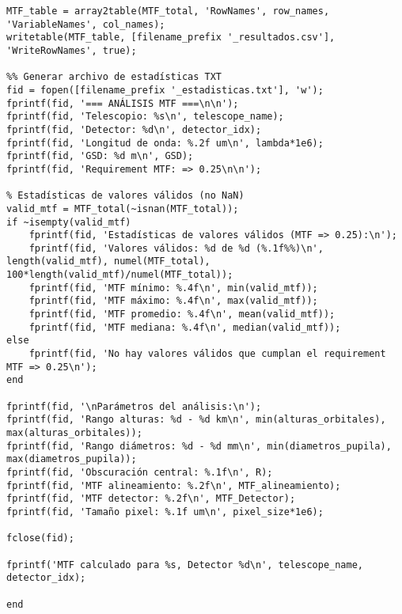 \begin{verbatim}
MTF_table = array2table(MTF_total, 'RowNames', row_names, 'VariableNames', col_names);
writetable(MTF_table, [filename_prefix '_resultados.csv'], 'WriteRowNames', true);

%% Generar archivo de estadísticas TXT
fid = fopen([filename_prefix '_estadisticas.txt'], 'w');
fprintf(fid, '=== ANÁLISIS MTF ===\n\n');
fprintf(fid, 'Telescopio: %s\n', telescope_name);
fprintf(fid, 'Detector: %d\n', detector_idx);
fprintf(fid, 'Longitud de onda: %.2f um\n', lambda*1e6);
fprintf(fid, 'GSD: %d m\n', GSD);
fprintf(fid, 'Requirement MTF: => 0.25\n\n');

% Estadísticas de valores válidos (no NaN)
valid_mtf = MTF_total(~isnan(MTF_total));
if ~isempty(valid_mtf)
    fprintf(fid, 'Estadísticas de valores válidos (MTF => 0.25):\n');
    fprintf(fid, 'Valores válidos: %d de %d (%.1f%%)\n', length(valid_mtf), numel(MTF_total), 100*length(valid_mtf)/numel(MTF_total));
    fprintf(fid, 'MTF mínimo: %.4f\n', min(valid_mtf));
    fprintf(fid, 'MTF máximo: %.4f\n', max(valid_mtf));
    fprintf(fid, 'MTF promedio: %.4f\n', mean(valid_mtf));
    fprintf(fid, 'MTF mediana: %.4f\n', median(valid_mtf));
else
    fprintf(fid, 'No hay valores válidos que cumplan el requirement MTF => 0.25\n');
end

fprintf(fid, '\nParámetros del análisis:\n');
fprintf(fid, 'Rango alturas: %d - %d km\n', min(alturas_orbitales), max(alturas_orbitales));
fprintf(fid, 'Rango diámetros: %d - %d mm\n', min(diametros_pupila), max(diametros_pupila));
fprintf(fid, 'Obscuración central: %.1f\n', R);
fprintf(fid, 'MTF alineamiento: %.2f\n', MTF_alineamiento);
fprintf(fid, 'MTF detector: %.2f\n', MTF_Detector);
fprintf(fid, 'Tamaño pixel: %.1f um\n', pixel_size*1e6);

fclose(fid);

fprintf('MTF calculado para %s, Detector %d\n', telescope_name, detector_idx);

end

\end{verbatim}